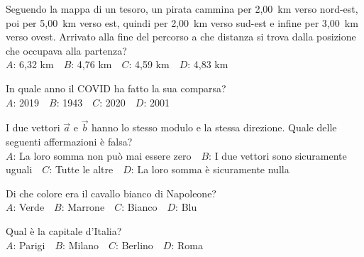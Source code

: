 \mcquestionfooter



\def\mcquestionnumber{9}


\mcquestionheader Seguendo la mappa di un tesoro, un pirata cammina per 2,00~km verso nord-est, poi per 5,00~km verso est, quindi per 2,00~km verso sud-est e infine per 3,00~km verso ovest. Arrivato alla fine del percorso a che distanza si trova dalla posizione che occupava alla partenza?\\
{$A$}: 6,32 km\ \ {$B$}: 4,76 km\ \ {$C$}: 4,59 km\ \ {$D$}: 4,83 km\ \ 

\mcquestionfooter



\def\mcquestionnumber{10}


\mcquestionheader In quale anno il COVID ha fatto la sua comparsa?\\
{$A$}: 2019\ \ {$B$}: 1943\ \ {$C$}: 2020\ \ {$D$}: 2001\ \ 

\mcquestionfooter



\def\mcquestionnumber{11}


\mcquestionheader I due vettori $\vec{a}$ e $\vec{b}$ hanno lo stesso modulo e la stessa direzione. Quale delle seguenti affermazioni è falsa?\\
{$A$}: La loro somma non può mai essere zero\ \ {$B$}: I due vettori sono sicuramente uguali\ \ {$C$}: Tutte le altre\ \ {$D$}: La loro somma è sicuramente nulla\ \ 

\mcquestionfooter



\def\mcquestionnumber{12}


\mcquestionheader Di che colore era il cavallo bianco di Napoleone?\\
{$A$}: Verde\ \ {$B$}: Marrone\ \ {$C$}: Bianco\ \ {$D$}: Blu\ \ 

\mcquestionfooter



\mcpaperfooter

\def\mcserialnumber{14}
\mcpaperheader


\def\mcquestionnumber{1}


\mcquestionheader Qual è la capitale d’Italia?\\
{$A$}: Parigi\ \ {$B$}: Milano\ \ {$C$}: Berlino\ \ {$D$}: Roma\ \ 

\mcquestionfooter



\def\mcquestionnumber{2}


